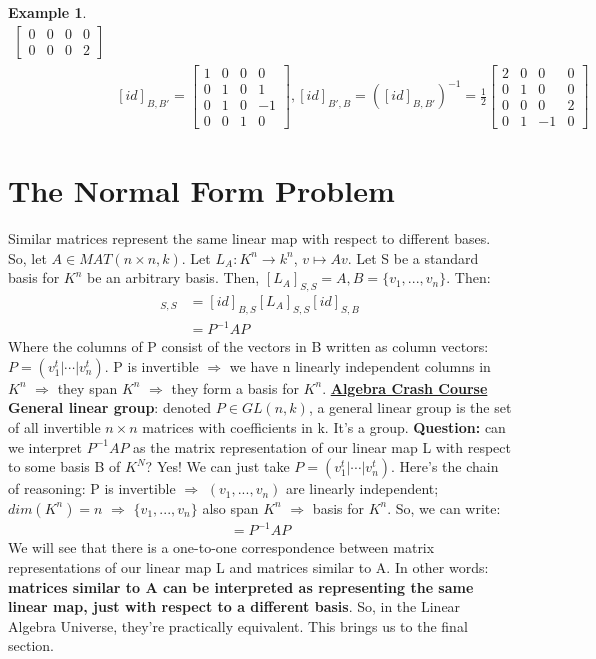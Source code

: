 \documentclass[a4paper, 12pt]{article}
\theoremstyle{definition}
\newtheorem{exmp}{Example}[section]
\theoremstyle{definition}
\theoremstyle{definition}
\theoremstyle{definition}
\begin{document}
{\begin{exmp}
\begin{align*}
\begin{bmatrix}
			0 & 0 & 0 & 0 \\
			0 & 0 & 0 & 2
		\end{bmatrix}  \\
		& [id]_{B,B'} = \begin{bmatrix}
			1 & 0 & 0 & 0 \\
			0 & 1 & 0 & 1 \\
			0 & 1 & 0 & -1 \\
			0 & 0 & 1 & 0 
		\end{bmatrix}, [id]_{B',B} = ([id]_{B,B'})^{-1} = \frac{1}{2} \begin{bmatrix}
			2 & 0 & 0 & 0 \\
			0 & 1 & 0 & 0 \\
			0 & 0 & 0 & 2 \\
			0 & 1 & -1 & 0 
		\end{bmatrix}
	\end{align*}
\end{exmp}
\section{The Normal Form Problem}
Similar matrices represent the same linear map with respect to different bases. So, let $A \in MAT(n \times n, k)$. Let $L_A: K^n \rightarrow k^n$, $v \mapsto Av$. Let S be a standard basis for $K^n$ be an arbitrary basis. Then, $[L_A]_{S,S} = A, B = \{ v_1, ..., v_n \}$. Then: 
\begin{align*}
	[L_A]_{S,S}&  = [id]_{B,S} [L_A]_{S,S} [id]_{S,B} \\
				& =  P^{-1} A P 
\end{align*}
Where the columns of P consist of the vectors in B written as column vectors: $P = (v_1^t | \cdots | v_n^t)$. P is invertible $\Rightarrow$ we have n linearly independent columns in $K^n$ $\Rightarrow$ they span $K^n$ $\Rightarrow$ they form a basis for $K^n$. 
\newline
\textbf{\underline{Algebra Crash Course}}
\newline 
\textbf{General linear group}: denoted $P \in GL(n,k)$, a general linear group is the set of all invertible $n \times n$ matrices with coefficients in k. It's a group. 
\newline
\newline
\textbf{Question:} can we interpret $P^{-1}AP$ as the matrix representation of our linear map L with respect to some basis B of $K^N$? Yes! We can just take $P = (v_1^t | \cdots | v_n^t)$. Here's the chain of reasoning: P is invertible $\Rightarrow$ $(v_1, ..., v_n)$ are linearly independent; $dim(K^n) = n$ $\Rightarrow$ $\{ v_1, ..., v_n \}$ also span $K^n$ $\Rightarrow$ basis for $K^n$. So, we can write: 
\begin{align*}
	[L_A] = P^{-1}AP
\end{align*}
We will see that there is a one-to-one correspondence between matrix representations of our linear map L and matrices similar to A. In other words: \textbf{matrices similar to A can be interpreted as representing the same linear map, just with respect to a different basis}. So, in the Linear Algebra Universe, they're practically equivalent. This brings us to the final section.
}
\end{document}
